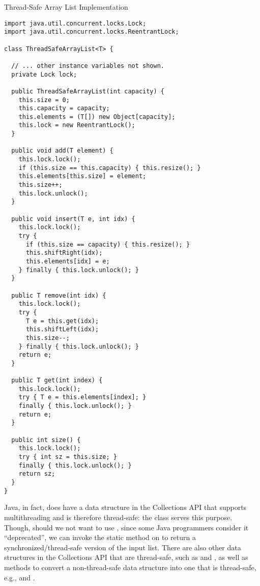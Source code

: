 \begin{cl}{Thread-Safe Array List Implementation}
\begin{lstlisting}[language=MyJava]
import java.util.concurrent.locks.Lock;
import java.util.concurrent.locks.ReentrantLock;

class ThreadSafeArrayList<T> {

  // ... other instance variables not shown.
  private Lock lock;

  public ThreadSafeArrayList(int capacity) {
    this.size = 0;
    this.capacity = capacity;
    this.elements = (T[]) new Object[capacity];
    this.lock = new ReentrantLock();
  }

  public void add(T element) {
    this.lock.lock();
    if (this.size == this.capacity) { this.resize(); }
    this.elements[this.size] = element;
    this.size++;
    this.lock.unlock();
  }

  public void insert(T e, int idx) {
    this.lock.lock();
    try {
      if (this.size == capacity) { this.resize(); }
      this.shiftRight(idx);
      this.elements[idx] = e;
    } finally { this.lock.unlock(); }
  }

  public T remove(int idx) {
    this.lock.lock();
    try {
      T e = this.get(idx);
      this.shiftLeft(idx);
      this.size--;
    } finally { this.lock.unlock(); }
    return e;
  }

  public T get(int index) {
    this.lock.lock();
    try { T e = this.elements[index]; }
    finally { this.lock.unlock(); }
    return e;
  }

  public int size() {
    this.lock.lock();
    try { int sz = this.size; }
    finally { this.lock.unlock(); }
    return sz;
  }
}
\end{lstlisting}
\end{cl}

Java, in fact, does have a data structure in the Collections API that supports multithreading and is therefore thread-safe: the  class serves this purpose. Though, should we not want to use , since some Java programmers consider it ``deprecated'', we can invoke the static  method on  to return a synchronized/thread-safe version of the input list. There are also other data structures in the Collections API that are thread-safe, such as  and , as well as methods to convert a non-thread-safe data structure into one that is thread-safe, e.g.,  and .

